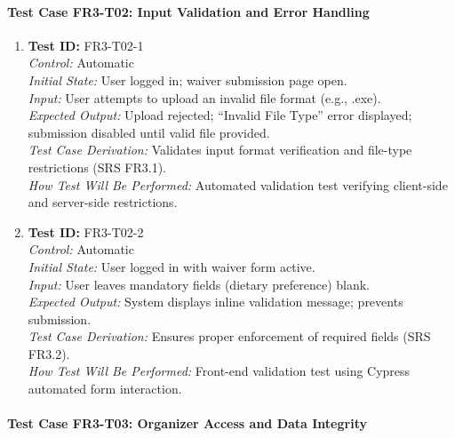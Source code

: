 \documentclass[12pt, titlepage]{article}
\begin{document}
\paragraph{Test Case FR3-T02: Input Validation and Error Handling}

\begin{enumerate}\setlength{\itemsep}{1em}
    \item \textbf{Test ID:} FR3-T02-1\\[0.5em]
    \textit{Control:} Automatic\\[0.3em]
    \textit{Initial State:} User logged in; waiver submission page open.\\[0.3em]
    \textit{Input:} User attempts to upload an invalid file format (e.g., .exe).\\[0.3em]
    \textit{Expected Output:} Upload rejected; “Invalid File Type” error displayed; submission disabled until valid file provided.\\[0.3em]
    \textit{Test Case Derivation:} Validates input format verification and file-type restrictions (SRS FR3.1).\\[0.3em]
    \textit{How Test Will Be Performed:} Automated validation test verifying client-side and server-side restrictions.

    \item \textbf{Test ID:} FR3-T02-2\\[0.5em]
    \textit{Control:} Automatic\\[0.3em]
    \textit{Initial State:} User logged in with waiver form active.\\[0.3em]
    \textit{Input:} User leaves mandatory fields (dietary preference) blank.\\[0.3em]
    \textit{Expected Output:} System displays inline validation message; prevents submission.\\[0.3em]
    \textit{Test Case Derivation:} Ensures proper enforcement of required fields (SRS FR3.2).\\[0.3em]
    \textit{How Test Will Be Performed:} Front-end validation test using Cypress automated form interaction.
\end{enumerate}


\paragraph{Test Case FR3-T03: Organizer Access and Data Integrity}
\end{document}
